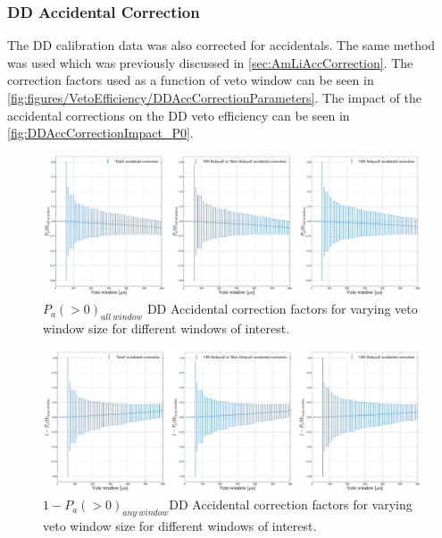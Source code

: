 \subsubsection{DD Accidental Correction}
The DD calibration data was also corrected for accidentals. The same method was used which was previously discussed in \autoref{sec:AmLiAccCorrection}. The correction factors used as a function of veto window can be seen in \autoref{fig:figures/VetoEfficiency/DDAccCorrectionParameters}.
The impact of the accidental corrections on the DD veto efficiency can be seen in \autoref{fig:DDAccCorrectionImpact_P0}.

\begin{figure}
	\centering
	\includegraphics[width=\textwidth]{figures/VetoEfficiency/DDAccCorrectionImpact_P0.pdf}
	\caption{$P_a(>0)_{all\:window}$ DD Accidental correction factors for varying veto window size for different windows of interest.}
	\label{fig:DDAccCorrectionImpact_P0}
\end{figure}

\begin{figure}
	\centering
	\includegraphics[width=\textwidth]{figures/VetoEfficiency/DDAccCorrectionImpact_1-P0.pdf}
	\caption{$1-P_a(>0)_{any\:window}$DD Accidental correction factors for varying veto window size for different windows of interest.}
	\label{fig:figures/VetoEfficiency/DDAccCorrectionImpact_1-P0}
\end{figure}

